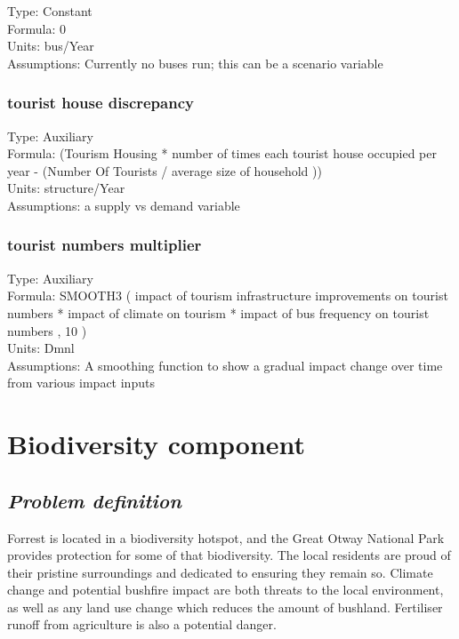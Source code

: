 \documentclass[
  11pt,
]{book}
\begin{document}
Type: Constant\\
Formula: 0\\
Units: bus/Year\\
Assumptions: Currently no buses run; this can be a scenario variable

\hypertarget{tourist-house-discrepancy}{%
\subsection{tourist house discrepancy}\label{tourist-house-discrepancy}}

Type: Auxiliary\\
Formula: (Tourism Housing * number of times each tourist house occupied per year - (Number Of Tourists / average size of household ))\\
Units: structure/Year\\
Assumptions: a supply vs demand variable

\hypertarget{tourist-numbers-multiplier}{%
\subsection{tourist numbers multiplier}\label{tourist-numbers-multiplier}}

Type: Auxiliary\\
Formula: SMOOTH3 ( impact of tourism infrastructure improvements on tourist numbers * impact of climate on tourism * impact of bus frequency on tourist numbers , 10 )\\
Units: Dmnl\\
Assumptions: A smoothing function to show a gradual impact change over time from various impact inputs

\hypertarget{biodiversity-component}{%
\chapter{Biodiversity component}\label{biodiversity-component}}

\hypertarget{problem-definition-5}{%
\section{\texorpdfstring{\emph{Problem definition}}{Problem definition}}\label{problem-definition-5}}

Forrest is located in a biodiversity hotspot, and the Great Otway National Park provides protection for some of that biodiversity. The local residents are proud of their pristine surroundings and dedicated to ensuring they remain so. Climate change and potential bushfire impact are both threats to the local environment, as well as any land use change which reduces the amount of bushland. Fertiliser runoff from agriculture is also a potential danger.
\end{document}
